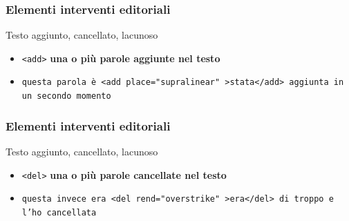 \begin{frame}
    \frametitle{Elementi interventi editoriali}
    \addtocounter{nframe}{1}
    

    \begin{block}{Testo aggiunto, cancellato, lacunoso}
        \begin{itemize}
            \item \texttt{<add>} \textbf{una o più parole aggiunte nel testo}
            \item[] \texttt{questa parola è <add place="supralinear" >stata</add> aggiunta in un secondo momento}
        \end{itemize}
        
    \end{block}
    
\end{frame}

\begin{frame}
    \frametitle{Elementi interventi editoriali}
    \addtocounter{nframe}{1}
    

    \begin{block}{Testo aggiunto, cancellato, lacunoso}
        \begin{itemize}
            \item \texttt{<del>} \textbf{una o più parole cancellate nel testo}
            \item[] \texttt{questa invece era <del rend="overstrike" >era</del> di troppo e l’ho cancellata}
        \end{itemize}
        
    \end{block}
    
\end{frame}


